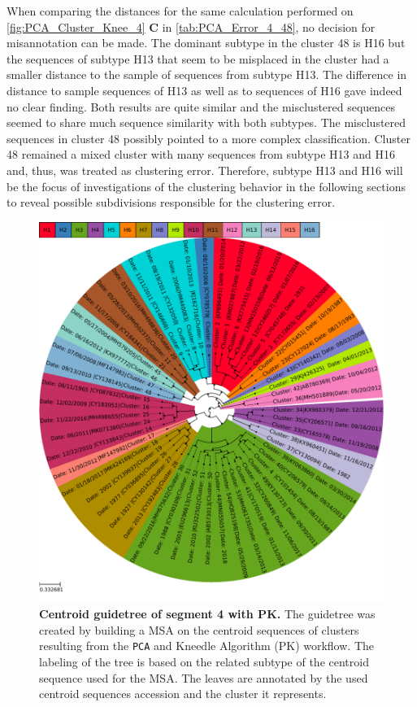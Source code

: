 \vspace{1em}

When comparing the distances for the same calculation performed on \autoref{fig:PCA_Cluster_Knee_4} \textbf{\textsf{C}} in \autoref{tab:PCA_Error_4_48}, no decision for misannotation can be made. The dominant subtype in the cluster 48 is H16 but the sequences of subtype H13 that seem to be misplaced in the cluster had a smaller distance to the sample of sequences from subtype H13. The difference in distance to sample sequences of H13 as well as to sequences of H16 gave indeed no clear finding. Both results are quite similar and the misclustered sequences seemed to share much sequence similarity with both subtypes. The misclustered sequences in cluster 48 possibly pointed to a more complex classification. Cluster 48 remained a mixed cluster with many sequences from subtype H13 and H16 and, thus, was treated as clustering error. Therefore, subtype H13 and H16 will be the focus of investigations of the clustering behavior in the following sections to reveal possible subdivisions responsible for the clustering error.

\begin{figure}[!hbt]
    \centering
    \includegraphics[width=\textwidth]{PCA/Guidetree_segment_4_H_Centroid.pdf}
    \caption[Centroid guidetree of segment 4 with PK]{\textbf{Centroid guidetree of segment 4 with PK.} The guidetree was created by building a \gls{MSA} on the centroid sequences of clusters resulting from the \texttt{PCA} and Kneedle Algorithm (PK) workflow. The labeling of the tree is based on the related subtype of the centroid sequence used for the \gls{MSA}. The leaves are annotated by the used centroid sequences accession and the cluster it represents.}
    \label{fig:PCA_Guidetree_Centroid_4}
\end{figure}

